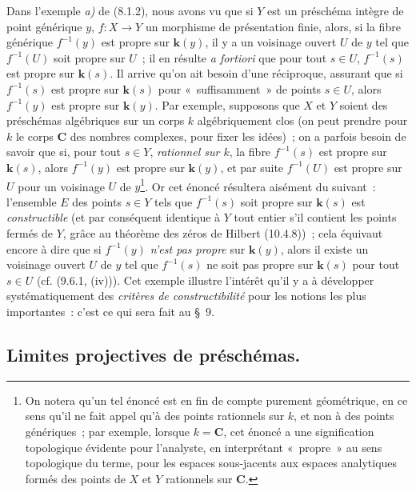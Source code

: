 \begin{env}[8.1.3]
\label{IV.8.1.3-fr}
Dans l'exemple \emph{a)} de (8.1.2), nous avons vu que si $Y$ est un
préschéma intègre de point générique $y$, $f:X\to Y$ un morphisme de
présentation finie, alors, si la fibre générique $f^{-1}(y)$ est propre sur
$\boldsymbol k(y)$, il y a un voisinage ouvert $U$ de $y$ tel que $f^{-1}(U)$
soit propre sur $U$~; il en résulte \emph{a fortiori} que pour tout $s\in U$,
$f^{-1}(s)$ est propre sur $\boldsymbol k(s)$. Il arrive qu'on ait besoin
d'une réciproque, assurant que si $f^{-1}(s)$ est propre sur
$\boldsymbol k(s)$ pour «~suffisamment~» de points $s\in U$, alors
$f^{-1}(y)$ est propre sur $\boldsymbol k(y)$. Par exemple, supposons que $X$
et $Y$ soient des préschémas algébriques sur un corps $k$ algébriquement clos
(on peut prendre pour $k$ le corps $\mathbf C$ des nombres complexes, pour
fixer les idées)~; on a parfois besoin de savoir que si, pour tout $s\in Y$,
\emph{rationnel sur $k$}, la fibre $f^{-1}(s)$ est propre sur
$\boldsymbol k(s)$, alors $f^{-1}(y)$ est propre sur $\boldsymbol k(y)$, et
par suite $f^{-1}(U)$ est propre sur $U$ pour un voisinage $U$ de
$y$\footnote{On notera qu'un tel énoncé est en fin de compte purement
géométrique, en ce sens qu'il ne fait appel qu'à des points rationnels sur
$k$, et non à des points génériques~; par exemple, lorsque $k=\mathbf C$, cet
énoncé a une signification topologique évidente pour l'analyste, en
interprétant «~propre~» au sens topologique du terme, pour les espaces
sous-jacents aux espaces analytiques formés des points de $X$ et $Y$
rationnels sur $\mathbf C$.}. Or cet énoncé résultera aisément du suivant~:
l'ensemble $E$ des points $s\in Y$ tels que $f^{-1}(s)$ soit propre sur
$\boldsymbol k(s)$ est \emph{constructible} (et par conséquent identique à
$Y$ tout entier s'il contient les points fermés de $Y$, grâce au théorème des
zéros de Hilbert (10.4.8))~; cela équivaut encore à dire que si $f^{-1}(y)$
\emph{n'est pas propre} sur $\boldsymbol k(y)$, alors il existe un voisinage
ouvert $U$ de $y$ tel que $f^{-1}(s)$ ne soit pas propre sur
$\boldsymbol k(s)$ pour tout $s\in U$ (cf. (9.6.1, (iv))). Cet exemple
illustre l'intérêt qu'il y a à développer systématiquement des \emph{critères
de constructibilité} pour les notions les plus importantes~: c'est ce qui
sera fait au \S~9.
\end{env}

\subsection{Limites projectives de préschémas.}
\label{subsection:IV.8.2-fr}

